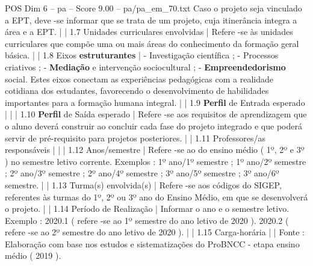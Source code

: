 \begin{textsample}{POS Dim 6 – pa – Score 9.00 – pa/pa\_em\_70.txt}
Caso o projeto seja vinculado a EPT, deve -se informar que se trata de um projeto, cuja itinerância integra a área e a EPT. | | 1.7 Unidades curriculares envolvidas | Refere -se às unidades curriculares que compõe uma ou mais áreas do conhecimento da formação geral básica. | | 1.8 Eixos \textbf{estruturantes} | - Investigação científica ; - Processos criativos ; - \textbf{Mediação} e intervenção sociocultural ; - \textbf{Empreendedorismo} social.
Estes eixos conectam as experiências pedagógicas com a realidade cotidiana dos estudantes, favorecendo o desenvolvimento de habilidades importantes para a formação humana integral. | | 1.9 \textbf{Perfil} de Entrada esperado | | | 1.10 \textbf{Perfil} de Saída esperado | Refere -se aos requisitos de aprendizagem que o aluno deverá construir ao concluir cada fase do projeto integrado e que poderá servir de pré-requisito para projetos posteriores. | | 1.11 Professores/as responsáveis | | | 1.12 Anos/semestre | Refere -se ao do ensino médio ( 1º, 2º e 3º ) no semestre letivo corrente.
Exemplos : 1º ano/1º semestre ; 1º ano/2º semestre ; 2º ano/3º semestre ; 2º ano/4º semestre ; 3º ano/5º semestre ; 3º ano/6º semestre. | | 1.13 Turma(s) envolvida(s) | Refere -se aos códigos do SIGEP, referentes às turmas do 1º, 2º ou 3º ano do Ensino Médio, em que se desenvolverá o projeto. | | 1.14 Período de Realização | Informar o ano e o semestre letivo.
Exemplo : 2020.1 ( refere -se ao 1º semestre do ano letivo de 2020 ). 2020.2 ( refere -se ao 2º semestre do ano letivo de 2020 ). | | 1.15 Carga-horária | | Fonte : Elaboração com base nos estudos e sistematizações do ProBNCC - etapa ensino médio ( 2019 ).

\end{textsample}
